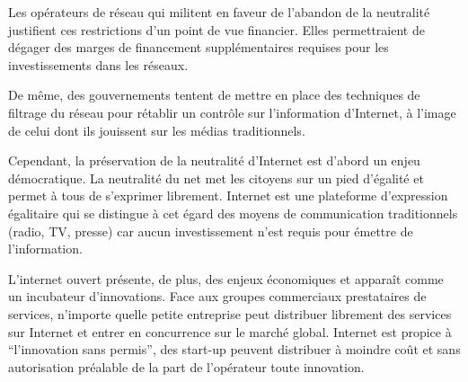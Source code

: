 \documentclass[11pt]{article}
\begin{document}

Les opérateurs de réseau qui militent en faveur de l'abandon de la neutralité justifient ces restrictions d'un point de vue financier. Elles permettraient de dégager des marges de financement supplémentaires requises pour les investissements dans les réseaux.

De même, des gouvernements tentent de mettre en place des techniques de filtrage du réseau pour rétablir un contrôle sur l'information d'Internet, à l'image de celui dont ils jouissent sur les médias traditionnels.

Cependant, la préservation de la neutralité d'Internet est d'abord un enjeu démocratique. La neutralité du net met les citoyens sur un pied d'égalité et permet à tous de s'exprimer librement. Internet est une plateforme d'expression égalitaire qui se distingue à cet égard des moyens de communication traditionnels (radio, TV, presse) car aucun investissement n'est requis pour émettre de l'information.

L'internet ouvert présente, de plus, des enjeux économiques et apparaît comme un incubateur d'innovations. Face aux groupes commerciaux prestataires de services, n'importe quelle petite entreprise peut distribuer librement des services sur Internet et entrer en concurrence sur le marché global. Internet est propice à \enquote{l'innovation sans permis}, des start-up peuvent distribuer à moindre coût et sans autorisation préalable de la part de l'opérateur toute innovation.


\end{document}
